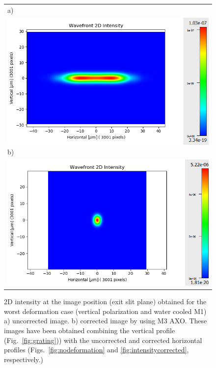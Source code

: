 \documentclass[preprint]{iucr}              %
\begin{document}
  \begin{figure}
  \label{fig:intensity2D} 
  \begin{center}
  \begin{tabular}{l} 
  a)\\
  \includegraphics[width=1\textwidth]{figures/intensity2Duncorrected.png}
  b)\\
  \includegraphics[width=1\textwidth]{figures/intensity2Dcorrected.png}

  \end{tabular}
  \end{center}
  \caption
  { 
2D intensity at the image position (exit slit plane) obtained for the worst deformation case (vertical polarization and water cooled M1) a) uncorrected image. b) corrected image by using M3 AXO. These images have been obtained combining the vertical profile (Fig.~\ref{fig:grating})) with the uncorrected and corrected horizontal profiles (Figs.~\ref{fig:nodeformation} and \ref{fig:intensitycorrected}, respectively.)
}
  \end{figure}
  
\end{document}

